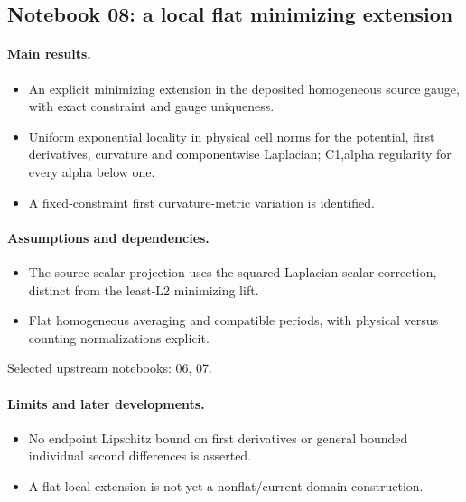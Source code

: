 \documentclass[11pt]{article}
\theoremstyle{remark}
\begin{document}
\subsection{Notebook 08: a local flat minimizing extension}
\label{hnc-08}
\noindent{}\par

\paragraph{Main results.}
\begin{itemize}
\item An explicit minimizing extension in the deposited homogeneous source gauge, with exact constraint and gauge uniqueness.
\item Uniform exponential locality in physical cell norms for the potential, first derivatives, curvature and componentwise Laplacian; C1,alpha regularity for every alpha below one.
\item A fixed-constraint first curvature-metric variation is identified.
\end{itemize}

\paragraph{Assumptions and dependencies.}
\begin{itemize}
\item The source scalar projection uses the squared-Laplacian scalar correction, distinct from the least-L2 minimizing lift.
\item Flat homogeneous averaging and compatible periods, with physical versus counting normalizations explicit.
\end{itemize}

Selected upstream notebooks: 06, 07.\par

\paragraph{Limits and later developments.}
\begin{itemize}
\item No endpoint Lipschitz bound on first derivatives or general bounded individual second differences is asserted.
\item A flat local extension is not yet a nonflat/current-domain construction.
\end{itemize}
\end{document}
